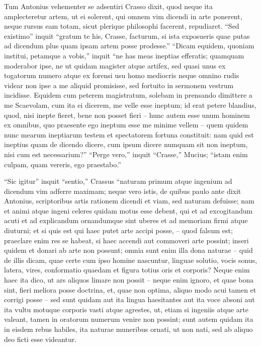 Tum Antonius vehementer se adsentiri Crasso dixit, quod neque ita amplecteretur artem, ut ei solerent, qui omnem vim dicendi in arte ponerent, neque rursus eam totam, sicut plerique philosophi facerent, repudiaret. ``Sed existimo'' inquit ``gratum te his, Crasse, facturum, si ista exposueris quae putas ad dicendum plus quam ipsam artem posse prodesse.'' ``Dicam equidem, quoniam institui, petamque a vobis,'' inquit ``ne has meas ineptias efferatis; quamquam moderabor ipse, ne ut quidam magister atque artifex, sed quasi unus ex togatorum numero atque ex forensi usu homo mediocris neque omnino rudis videar non ipse a me aliquid promisisse, sed fortuito in sermonem vestrum incidisse. Equidem cum peterem magistratum, solebam in prensando dimittere a me Scaevolam, cum ita ei dicerem, me velle esse ineptum; id erat petere blandius, quod, nisi inepte fieret, bene non posset fieri – hunc autem esse unum hominem ex omnibus, quo praesente ego ineptum esse me minime vellem – quem quidem nunc mearum ineptiarum testem et spectatorem fortuna constituit: nam quid est ineptius quam de dicendo dicere, cum ipsum dicere numquam sit non ineptum, nisi cum est necessarium?'' ``Perge vero,'' inquit ``Crasse,'' Mucius; ``istam enim culpam, quam vereris, ego praestabo.''

``Sic igitur'' inquit ``sentio,'' Crassus ``naturam primum atque ingenium ad dicendum vim adferre maximam; neque vero istis, de quibus paulo ante dixit Antonius, scriptoribus artis rationem dicendi et viam, sed naturam defuisse; nam et animi atque ingeni celeres quidam motus esse debent, qui et ad excogitandum acuti et ad explicandum ornandumque sint uberes et ad memoriam firmi atque diuturni; et si quis est qui haec putet arte accipi posse, – quod falsum est; praeclare enim res se habeat, si haec accendi aut commoveri arte possint; inseri quidem et donari ab arte non possunt; omnia sunt enim illa dona naturae – quid de illis dicam, quae certe cum ipso homine nascuntur, linguae solutio, vocis sonus, latera, vires, conformatio quaedam et figura totius oris et corporis? Neque enim haec ita dico, ut ars aliquos limare non possit – neque enim ignoro, et quae bona sint, fieri meliora posse doctrina, et, quae non optima, aliquo modo acui tamen et corrigi posse – sed sunt quidam aut ita lingua haesitantes aut ita voce absoni aut ita vultu motuque corporis vasti atque agrestes, ut, etiam si ingeniis atque arte valeant, tamen in oratorum numerum venire non possint; sunt autem quidam ita in eisdem rebus habiles, ita naturae muneribus ornati, ut non nati, sed ab aliquo deo ficti esse videantur. 

